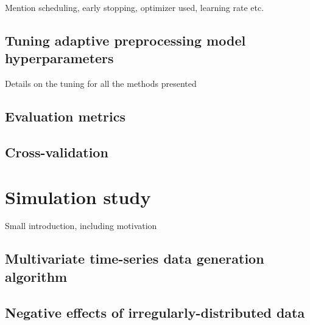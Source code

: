 \documentclass{statsmsc}
\begin{document}
Mention scheduling, early stopping, optimizer used, learning rate etc.

\subsection{Tuning adaptive preprocessing model hyperparameters}%
\label{sub:Tuning adaptive preprocessing model hyperparameters}

Details on the tuning for all the methods presented

\subsection{Evaluation metrics}%
\label{sub:Evaluation metrics}


\subsection{Cross-validation}%
\label{sub:Cross-validation}



\section{Simulation study}%
\label{sec:Simulation study}%

Small introduction, including motivation

\subsection{Multivariate time-series data generation algorithm}%
\label{sub:Multivariate time-series data generation algorithm}




\subsection{Negative effects of irregularly-distributed data}%
\label{sub:Negative effects of irregularly-distributed data}


\end{document}
